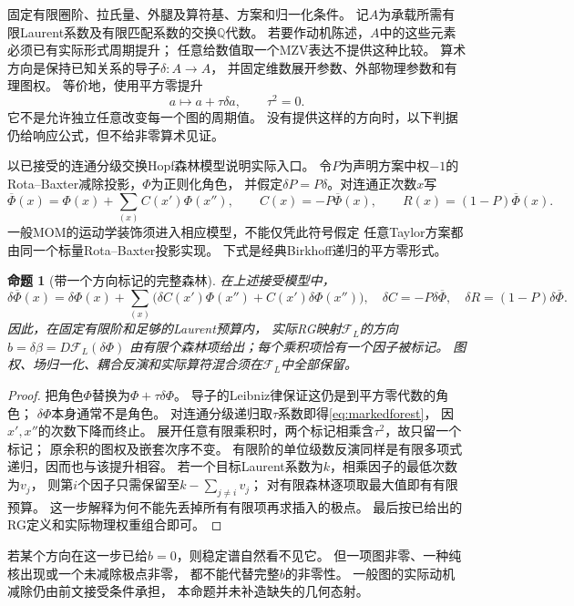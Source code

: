 \documentclass[11pt,a4paper]{ctexart}
\theoremstyle{cnplain}\newtheorem{theorem}{定理}[section]
\newtheorem{proposition}[theorem]{命题}
\theoremstyle{definition}\newtheorem{definition}[theorem]{定义}
\theoremstyle{remark}\newtheorem{remark}[theorem]{注}
\newcommand{\Q}{\mathbb Q}\newcommand{\cC}{\mathcal C}
\begin{document}
固定有限圈阶、拉氏量、外腿及算符基、方案和归一化条件。
记$A$为承载所需有限Laurent系数及有限匹配系数的交换$\Q$代数。
若要作动机陈述，$A$中的这些元素必须已有实际形式周期提升；
任意给数值取一个MZV表达不提供这种比较。
算术方向是保持已知关系的导子$\delta:A\to A$，
并固定维数展开参数、外部物理参数和有理图权。
等价地，使用平方零提升
\[
 a\longmapsto a+\tau\delta a,\qquad \tau^2=0.
\]
它不是允许独立任意改变每一个图的周期值。
没有提供这样的方向时，以下判据仍给响应公式，但不给非零算术见证。

以已接受的连通分级交换Hopf森林模型说明实际入口。
令$P$为声明方案中权$-1$的Rota--Baxter减除投影，$\Phi$为正则化角色，
并假定$\delta P=P\delta$。对连通正次数$x$写
\[
 \overline\Phi(x)=\Phi(x)+\sum_{(x)} C(x')\Phi(x''),\qquad
 C(x)=-P\overline\Phi(x),\qquad
 R(x)=(1-P)\overline\Phi(x).
\]
一般MOM的运动学装饰须进入相应模型，不能仅凭此符号假定
任意Taylor方案都由同一个标量Rota--Baxter投影实现。
下式是经典Birkhoff递归的平方零形式\cite{GZcrit}。

\begin{proposition}[带一个方向标记的完整森林]\label{prop:markedrgforest}
在上述接受模型中，
\[
 \delta\overline\Phi(x)=\delta\Phi(x)+
 \sum_{(x)}
 \bigl(\delta C(x')\Phi(x'')+C(x')\delta\Phi(x'')\bigr),
 \quad
 \delta C=-P\delta\overline\Phi,\quad
 \delta R=(1-P)\delta\overline\Phi.
 \tag{CF1}\label{eq:markedforest}
\]
因此，在固定有限阶和足够的Laurent预算内，
实际RG映射$\mathcal F_L$的方向
$b=\delta\beta=D\mathcal F_L(\delta\Phi)$
由有限个森林项给出；每个乘积项恰有一个因子被标记。
图权、场归一化、耦合反演和实际算符混合须在$\mathcal F_L$中全部保留。
\end{proposition}
\begin{proof}
把角色$\Phi$替换为$\Phi+\tau\delta\Phi$。
导子的Leibniz律保证这仍是到平方零代数的角色；
$\delta\Phi$本身通常不是角色。
对连通分级递归取$\tau$系数即得\eqref{eq:markedforest}，
因$x',x''$的次数下降而终止。
展开任意有限乘积时，两个标记相乘含$\tau^2$，故只留一个标记；
原余积的图权及嵌套次序不变。
有限阶的单位级数反演同样是有限多项式递归，因而也与该提升相容。
若一个目标Laurent系数为$k$，相乘因子的最低次数为$v_j$，
则第$i$个因子只需保留至$k-\sum_{j\ne i}v_j$；
对有限森林逐项取最大值即有有限预算。
这一步解释为何不能先丢掉所有有限项再求插入的极点。
最后按已给出的RG定义和实际物理权重组合即可。
\end{proof}

若某个方向在这一步已给$b=0$，则稳定谱自然看不见它。
但一项图非零、一种纯核出现或一个未减除极点非零，
都不能代替完整$b$的非零性。
一般图的实际动机减除仍由前文接受条件承担，
本命题并未补造缺失的几何态射。
\end{document}
